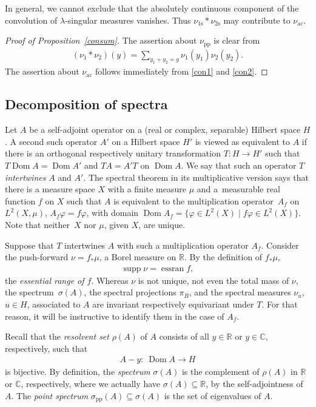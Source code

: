 \documentclass[pdftex]{sigma}
\numberwithin{equation}{section}
\DeclareMathOperator{\dom}{Dom}
\DeclareMathOperator{\essran}{essran}
\DeclareMathOperator{\supp}{supp}
\def\p{\mathrm{pp}}
\def\ac{\mathrm{ac}}
\def\s{\mathrm s}
\def\C{\mathbb C}
\def\R{\mathbb R}
\def\vf{\varphi}
\begin{document}
In general,
we cannot exclude that the absolutely continuous component of the convolution of $\lambda$-singular measures vanishes.
Thus $\nu_{1\s}*\nu_{2\s}$ may contribute to $\nu_{\ac}$.

\begin{proof}[Proof of Proposition~\ref{consum}]
The assertion about $\nu_{\p}$ is clear from
\begin{align*}
	(\nu_1*\nu_2)(y) = \sum_{y_1+y_2=y}\nu_1(y_1)\nu_2(y_2).
\end{align*}
The assertion about $\nu_{\ac}$ follows immediately from \eqref{con1} and \eqref{con2}.
\end{proof}

\subsection{Decomposition of spectra}%
Let $A$ be a self-adjoint operator on a (real or complex, separable) Hilbert space $H$.
A second such operator $A'$ on a Hilbert space $H'$ is viewed as equivalent to $A$
if there is an orthogonal respectively unitary transformation $T\colon H\to H'$
such that $T\dom A=\dom A'$ and $TA=A'T$ on $\dom A$.
We say that such an operator $T$ \emph{intertwines} $A$ and $A'$.
The spectral theorem in its multiplicative version says that there is a measure space $X$
with a finite measure $\mu$ and a~measurable real function $f$ on $X$
such that $A$ is equivalent to the multiplication operator~$A_f$ on $L^2(X,\mu)$, $A_f\vf=f\vf$,
with domain $\dom A_f=\{\vf\in L^2(X)\mid f\vf\in L^2(X)\}$.
Note that neither~$X$ nor $\mu$, given $X$, are unique.

Suppose that $T$ intertwines $A$ with such a multiplication operator $A_f$.
Consider the push-forward $\nu=f_*\mu$, a Borel measure on $\mathbb{R}$.
By the definition of $f_*\mu$,
\begin{align*}%
	\supp\nu = \essran f,
\end{align*}
the \emph{essential range of $f$}.
Whereas $\nu$ is not unique, not even the total mass of $\nu$,
the spectrum~$\sigma (A)$, the spectral projections $\pi_B$, and the spectral measures $\nu_u$, $u\in H$,
associated to $A$ are invariant respectively equivariant under $T$.
For that reason, it will be instructive to identify them in the case of $A_f$.

Recall that the \emph{resolvent set} $\rho(A)$ of $A$ consists of all $y\in\R$ or $y \in \C$, respectively, such that
\begin{align*}
	A-y \colon \ \dom A \to H
\end{align*}
is bijective.
By definition, the \emph{spectrum} $\sigma(A)$ is the complement of $\rho(A)$ in $\R$ or $\C$, respectively,
where we actually have $\sigma(A)\subseteq\R$, by the self-adjointness of $A$.
The \emph{point spectrum} ${\sigma_{\p}(A)\subseteq\sigma(A)}$ is the set of eigenvalues of $A$.
\end{document}
